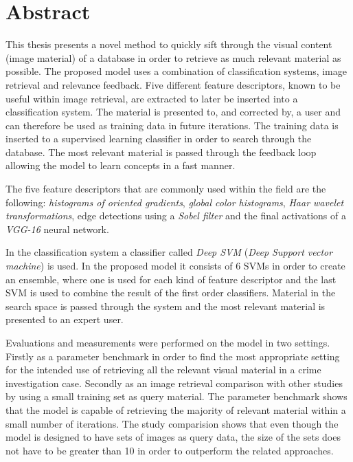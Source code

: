 \thispagestyle{plain}			%
\setlength{\parskip}{0pt plus 1.0pt}
\section*{Abstract}
This thesis presents a novel method to quickly sift through the visual content (image material) of a database in order to retrieve as much relevant material as possible. The proposed model uses a combination of classification systems, image retrieval and relevance feedback. Five different feature descriptors, known to be useful within image retrieval, are extracted to later be inserted into a classification system. The material is presented to, and corrected by, a user and can therefore be used as training data in future iterations. The training data is inserted to a supervised learning classifier in order to search through the database. The most relevant material is passed through the feedback loop allowing the model to learn concepts in a fast manner.

The five feature descriptors that are commonly used within the field are the following: \emph{histograms of oriented gradients}, \emph{global color histograms}, \emph{Haar wavelet transformations}, edge detections using a \emph{Sobel filter} and the final activations of a \emph{VGG-16} neural network.

In the classification system a classifier called \emph{Deep SVM} (\emph{Deep Support vector machine}) is used. In the proposed model it consists of 6 SVMs in order to create an ensemble, where one is used for each kind of feature descriptor and the last SVM is used to combine the result of the first order classifiers. Material in the search space is passed through the system and the most relevant material is presented to an expert user.

Evaluations and measurements were performed on the model in two settings. Firstly as a parameter benchmark in order to find the most appropriate setting for the intended use of retrieving all the relevant visual material in a crime investigation case. Secondly as an image retrieval comparison with other studies by using a small training set as query material. The parameter benchmark shows that the model is capable of retrieving the majority of relevant material within a small number of iterations. The study comparision shows that even though the model is designed to have sets of images as query data, the size of the sets does not have to be greater than 10 in order to outperform the related approaches. 

